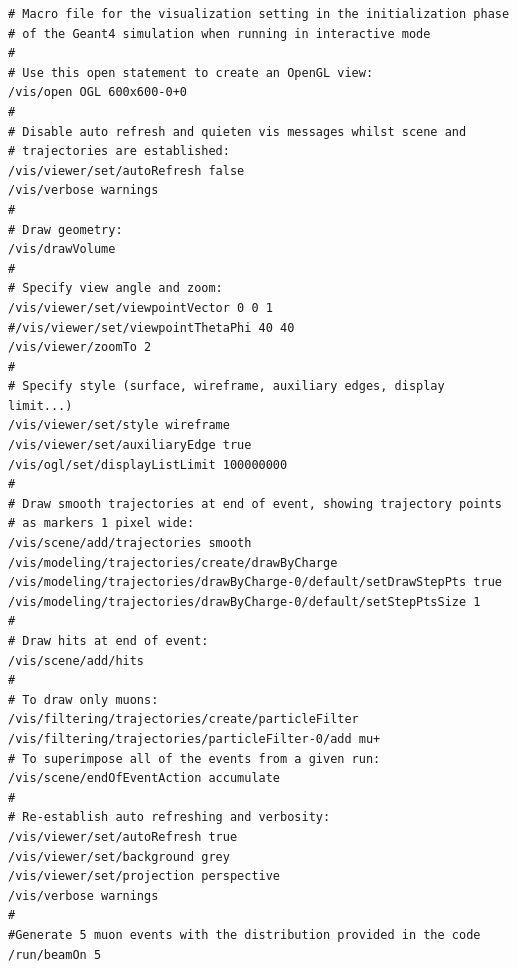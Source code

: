 \begin{verbatim}
# Macro file for the visualization setting in the initialization phase 
# of the Geant4 simulation when running in interactive mode
#
# Use this open statement to create an OpenGL view:
/vis/open OGL 600x600-0+0
#
# Disable auto refresh and quieten vis messages whilst scene and
# trajectories are established:
/vis/viewer/set/autoRefresh false
/vis/verbose warnings
#
# Draw geometry:
/vis/drawVolume
#
# Specify view angle and zoom:
/vis/viewer/set/viewpointVector 0 0 1
#/vis/viewer/set/viewpointThetaPhi 40 40
/vis/viewer/zoomTo 2
#
# Specify style (surface, wireframe, auxiliary edges, display limit...)
/vis/viewer/set/style wireframe
/vis/viewer/set/auxiliaryEdge true
/vis/ogl/set/displayListLimit 100000000
#
# Draw smooth trajectories at end of event, showing trajectory points
# as markers 1 pixel wide:
/vis/scene/add/trajectories smooth
/vis/modeling/trajectories/create/drawByCharge
/vis/modeling/trajectories/drawByCharge-0/default/setDrawStepPts true
/vis/modeling/trajectories/drawByCharge-0/default/setStepPtsSize 1
#
# Draw hits at end of event:
/vis/scene/add/hits
#
# To draw only muons:
/vis/filtering/trajectories/create/particleFilter
/vis/filtering/trajectories/particleFilter-0/add mu+
# To superimpose all of the events from a given run:
/vis/scene/endOfEventAction accumulate
#
# Re-establish auto refreshing and verbosity:
/vis/viewer/set/autoRefresh true
/vis/viewer/set/background grey
/vis/viewer/set/projection perspective
/vis/verbose warnings
#
#Generate 5 muon events with the distribution provided in the code
/run/beamOn 5

\end{verbatim}


